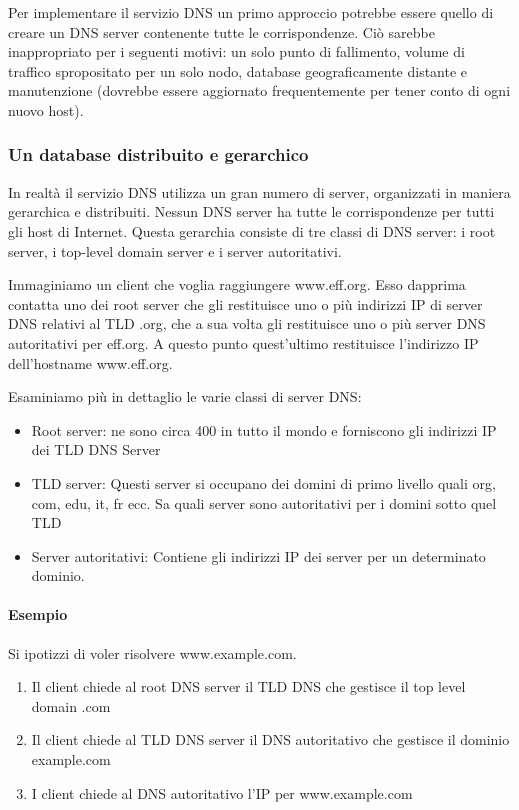 \documentclass{book}
\begin{document}
Per implementare il servizio DNS un primo approccio potrebbe essere quello di creare un DNS server contenente tutte le corrispondenze. Ciò sarebbe inappropriato per i seguenti motivi: un solo punto di fallimento, volume di traffico spropositato per un solo nodo, database geograficamente distante e manutenzione (dovrebbe essere aggiornato frequentemente per tener conto di ogni nuovo host).

\subsubsection*{Un database distribuito e gerarchico}
In realtà il servizio DNS utilizza un gran numero di server, organizzati in maniera gerarchica e distribuiti. Nessun DNS server ha tutte le corrispondenze per tutti gli host di Internet. Questa gerarchia consiste di tre classi di DNS server: i root server, i top-level domain server e i server autoritativi.

Immaginiamo un client che voglia raggiungere www.eff.org. Esso dapprima contatta uno dei root server che gli restituisce uno o più indirizzi IP di server DNS relativi al TLD .org, che a sua volta gli restituisce uno o più server DNS autoritativi per eff.org. A questo punto quest'ultimo restituisce l'indirizzo IP dell'hostname www.eff.org.

Esaminiamo più in dettaglio le varie classi di server DNS:
\begin{itemize}
	\item Root server: ne sono circa 400 in tutto il mondo e forniscono gli indirizzi IP dei TLD DNS Server
	\item TLD server: Questi server si occupano dei domini di primo livello quali org, com, edu, it, fr ecc. Sa quali server sono autoritativi per i domini sotto quel TLD
	\item Server autoritativi: Contiene gli indirizzi IP dei server per un determinato dominio.
\end{itemize}

\paragraph{Esempio} Si ipotizzi di voler risolvere www.example.com. 

\begin{enumerate}
	\item Il client chiede al root DNS server il TLD DNS che gestisce il top level domain .com
	\item Il client chiede al TLD DNS server il DNS autoritativo che gestisce il dominio example.com
	\item I client chiede al DNS autoritativo l'IP per www.example.com
\end{enumerate}
\end{document}
